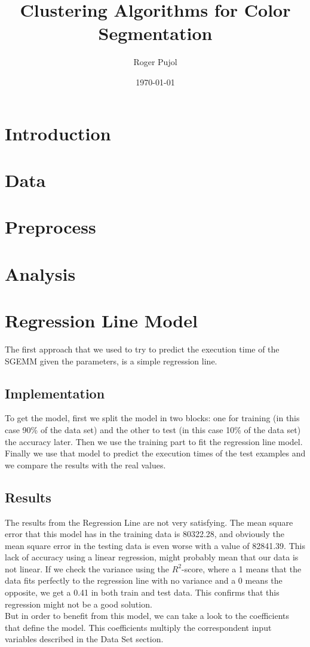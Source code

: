 \documentclass[sigconf,authorversion]{acmart}
\title{Clustering Algorithms for Color Segmentation}
\author{Roger Pujol}
\affiliation{%
  \institution{Universitat Politècnica de Catalunya (UPC)}
  \city{Barcelona}
  \country{Spain}}
\date{\today}
\begin{document}
\maketitle

\section{Introduction}

\section{Data}

\section{Preprocess}

\section{Analysis}

\section{Regression Line Model}
The first approach that we used to try to predict the execution time of the SGEMM given the parameters, is a simple regression line.
\subsection{Implementation}
To get the model, first we split the model in two blocks: one for training (in this case 90\% of the data set) and the other to test (in this case 10\% of the data set) the accuracy later. Then we use the training part to fit the regression line model. Finally we use that model to predict the execution times of the test examples and we compare the results with the real values.
\subsection{Results}
The results from the Regression Line are not very satisfying. The mean square error that this model has in the training data is 80322.28, and obviously the mean square error in the testing data is even worse with a value of 82841.39. This lack of accuracy using a linear regression, might probably mean that our data is not linear. If we check the variance using the $R^2$-score, where a 1 means that the data fits perfectly to the regression line with no variance and a 0 means the opposite, we get a 0.41 in both train and test data. This confirms that this regression might not be a good solution.\\
But in order to benefit from this model, we can take a look to the coefficients that define the model. This coefficients multiply the correspondent input variables described in the Data Set section.
\end{document}
